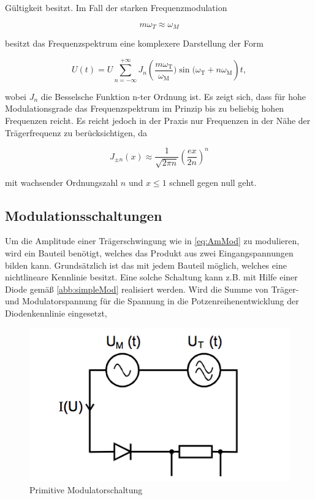 Gültigkeit besitzt. Im Fall der starken Frequenzmodulation

\begin{equation}
m\omega_T \approx \omega_M
\end{equation}

besitzt das Frequenzspektrum eine komplexere Darstellung der Form

\begin{equation}
U(t) = U \sum_{n=-\infty}^{+\infty} J_{n}\left(\frac{m\omega_\text{T}}{\omega_\text{M}})\sin(\omega_\text{T} + n\omega_\text{M}\right)t,
\end{equation}

wobei $J_n$ die Besselsche Funktion n-ter Ordnung ist. Es zeigt sich, dass für hohe Modulationsgrade das Frequenzspektrum im Prinzip bis zu beliebig hohen Frequenzen reicht. Es reicht jedoch in der Praxis nur Frequenzen in der Nähe der Trägerfrequenz zu berücksichtigen, da

\begin{equation}
J_{\pm n}(x) \approx \frac{1}{\sqrt{2\pi n}}(\frac{ex}{2n})^n
\end{equation}

mit wachsender Ordnungszahl $n$ und $x \leq 1$ schnell gegen null geht.

\subsection{Modulationsschaltungen}
Um die Amplitude einer Trägerschwingung wie in \autoref{eq:AmMod} zu modulieren, wird ein Bauteil benötigt, welches das Produkt aus zwei Eingangspannungen bilden kann. Grundsätzlich ist das mit jedem Bauteil möglich, welches eine nichtlineare Kennlinie besitzt.
Eine solche Schaltung kann z.B. mit Hilfe einer Diode gemäß \autoref{abb:simpleMod} realisiert werden. Wird die Summe von Träger- und Modulatorspannung für die Spannung in die Potzenreihenentwicklung der Diodenkennlinie eingesetzt,

\begin{figure}
	\centering
	\includegraphics[width=\textwidth]{img/Abb4.png}
	\caption{Primitive Modulatorschaltung \cite{FP}}
	\label{abb:simpleMod}
\end{figure}

